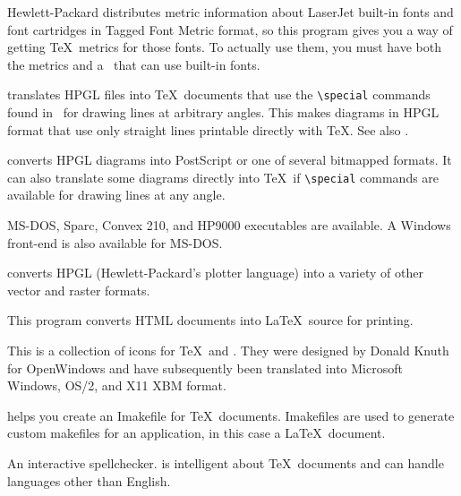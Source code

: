 Hewlett-Packard distributes metric information about LaserJet built-in
fonts and font cartridges in Tagged Font Metric format, so this program
gives you a way of getting \TeX\ metrics for those fonts.
To actually use them, you must have both the metrics and a \dvidriver\
that can use built-in fonts.

\newpage
{}

 translates HPGL files into \TeX\ documents that use
the \verb|\special| commands found in \emTeX\ for drawing lines at arbitrary
angles.  This makes diagrams in HPGL format that use only straight lines 
printable directly with \TeX.  See also \program{HP2XX}.


 converts HPGL diagrams into PostScript or one of several
bitmapped formats.  It can also translate some diagrams directly into
\TeX\ if \verb|\special| commands are available for drawing lines at
any angle.

MS-DOS, Sparc, Convex 210, and HP9000 executables are available.
A Windows front-end is also available for MS-DOS.


 converts HPGL (Hewlett-Packard's plotter language) into
a variety of other vector and raster formats.



This program converts HTML documents into \LaTeX\ source for printing.


This is a collection of icons for \TeX\ and \MF.  They were designed by
Donald Knuth for OpenWindows and have subsequently been translated into
Microsoft Windows, OS/2, and X11 XBM format.


 helps you create an Imakefile for \TeX\ documents.
Imakefiles are used to generate custom makefiles for an application,
in this case a \LaTeX\ document.


An interactive spellchecker.   is intelligent about
\TeX\ documents and can handle languages other than English.

